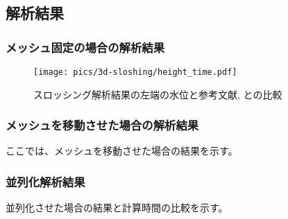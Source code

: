 \subsection{解析結果}
\subsubsection{メッシュ固定の場合の解析結果}
\begin{figure}[H]
    \centering
	\texttt{[image: pics/3d-sloshing/height\_time.pdf]}
	\caption{スロッシング解析結果の左端の水位と参考文献\cite{Okamoto1992}, \cite{Sakuraba2001}との比較}
	\label{fig:3d-sloshing-result}
\end{figure}

\subsubsection{メッシュを移動させた場合の解析結果}
ここでは、メッシュを移動させた場合の結果を示す。

\subsubsection{並列化解析結果}
並列化させた場合の結果と計算時間の比較を示す。

